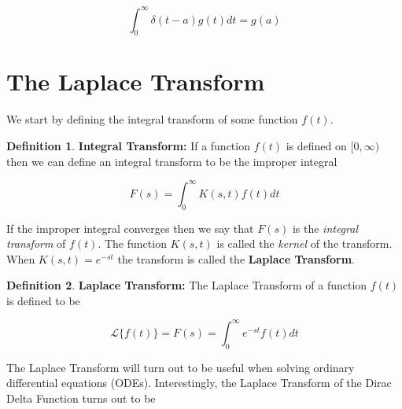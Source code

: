 \documentclass{article}
\theoremstyle{definition}
\newtheorem{definition}{Definition}[section]
\begin{document}
\bigskip
\begin{equation*}
  \int_{0}^{\infty} \delta (t-a) g(t) dt = g(a)
\end{equation*}

\bigskip
\section{The Laplace Transform}
We start by defining the integral transform of some function $f(t)$.

\bigskip
\begin{definition} 
{\bf Integral Transform:} If a function $f(t)$ is defined on $[0,\infty)$ then we can define an integral transform to be the improper integral
\end{definition}

\begin{equation*}
F(s) = \int_0^\infty K(s,t) f(t) dt
\end{equation*}

\bigskip
\noindent
If the improper integral converges then we say that $F(s)$ is the \emph{integral transform} of $f(t)$. The function $K(s,t)$ is called the \emph{kernel}
of the transform. When $K(s,t) = e^{-st}$ the transform is called the {\bf Laplace Transform}.

\bigskip
\begin{definition} 
{\bf Laplace Transform:} The Laplace Transform of a function $f(t)$ is defined to be
\label{def:laplace_transform}
\end{definition}


\begin{equation}
\mathcal{L}\{f(t)\} = F(s) = \int_0^\infty e^{-st} f(t) dt
\label{eqn:laplace_transform}
\end{equation}

\bigskip
\noindent
The Laplace Transform will turn out to be useful when solving ordinary differential equations (ODEs). Interestingly, the Laplace Transform of the 
Dirac Delta Function turns out to be
\end{document}
